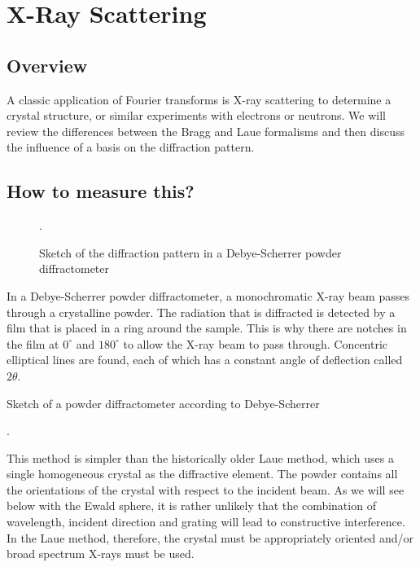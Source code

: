 \renewcommand{\chapterauthors}{Markus Lippitz}
\renewcommand{\lastmod}{October 27, 2023}


\chapter{X-Ray Scattering}




\section{Overview}
A classic application of Fourier transforms is X-ray scattering to determine a crystal structure, or similar experiments with electrons or neutrons. We will review the differences between the Bragg and Laue formalisms and then discuss the influence of a basis on the diffraction pattern.

\section{How to measure this?}

\begin{figure}
  \caption{Sketch of the diffraction pattern in a Debye-Scherrer powder diffractometer}.
\end{figure}


In a Debye-Scherrer powder diffractometer, a monochromatic X-ray beam passes through a crystalline powder. The radiation that is diffracted is detected by a film that is placed in a ring around the sample. This is why there are notches in the film at $0^\circ$ and $180^\circ$ to allow the X-ray beam to pass through. Concentric elliptical lines are found, each of which has a constant angle of deflection called $2\theta$.

\begin{marginfigure}
  \caption{Sketch of a powder diffractometer according to Debye-Scherrer}.
\end{marginfigure}

This method is simpler than the historically older Laue method, which uses a single homogeneous crystal as the diffractive element. The powder contains all the orientations of the crystal with respect to the incident beam. As we will see below with the Ewald sphere, it is rather unlikely that the combination of wavelength, incident direction and grating will lead to constructive interference. In the Laue method, therefore, the crystal must be appropriately oriented and/or broad spectrum X-rays must be used.

